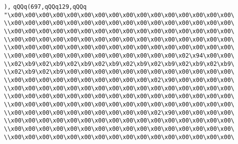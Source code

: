 \verb|),|\newline
\verb|qQQq(697,qQQq129,qQQq|\newline
\verb|"\x00\x00\x00\x00\x00\x00\x00\x00\x00\x00\x00\x00\x00\x00\x00\x00\|\newline
\verb|\\x00\x00\x00\x00\x00\x00\x00\x00\x00\x00\x00\x00\x00\x00\x00\x00\|\newline
\verb|\\x00\x00\x00\x00\x00\x00\x00\x00\x00\x00\x00\x00\x00\x00\x00\x00\|\newline
\verb|\\x00\x00\x00\x00\x00\x00\x00\x00\x00\x00\x00\x00\x00\x00\x00\x00\|\newline
\verb|\\x00\x00\x00\x00\x00\x00\x00\x00\x00\x00\x00\x00\x00\x00\x00\x00\|\newline
\verb|\\x00\x00\x00\x00\x00\x00\x00\x00\x00\x00\x00\x00\x02\x94\x00\x00\|\newline
\verb|\\x02\xb9\x02\xb9\x02\xb9\x02\xb9\x02\xb9\x02\xb9\x02\xb9\x02\xb9\|\newline
\verb|\\x02\xb9\x02\xb9\x00\x00\x00\x00\x00\x00\x00\x00\x00\x00\x00\x00\|\newline
\verb|\\x00\x00\x00\x00\x00\x00\x00\x00\x00\x00\x02\x90\x00\x00\x00\x00\|\newline
\verb|\\x00\x00\x00\x00\x00\x00\x00\x00\x00\x00\x00\x00\x00\x00\x00\x00\|\newline
\verb|\\x00\x00\x00\x00\x00\x00\x00\x00\x00\x00\x00\x00\x00\x00\x00\x00\|\newline
\verb|\\x00\x00\x00\x00\x00\x00\x00\x00\x00\x00\x00\x00\x00\x00\x00\x00\|\newline
\verb|\\x00\x00\x00\x00\x00\x00\x00\x00\x00\x00\x02\x90\x00\x00\x00\x00\|\newline
\verb|\\x00\x00\x00\x00\x00\x00\x00\x00\x00\x00\x00\x00\x00\x00\x00\x00\|\newline
\verb|\\x00\x00\x00\x00\x00\x00\x00\x00\x00\x00\x00\x00\x00\x00\x00\x00\|\newline
\verb|\\x00\x00\x00\x00\x00\x00\x00\x00\x00\x00\x00\x00\x00\x00\x00\x00\|\newline
